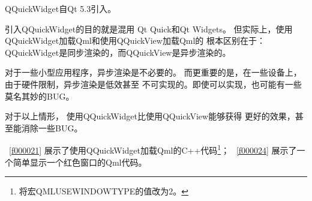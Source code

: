 QQuickWidget自Qt 5.3引入。

引入QQuickWidget的目的就是混用
Qt Quick和Qt Widgets。
但实际上，使用QQuickWidget加载Qml和使用QQuickView加载Qml的
根本区别在于：
QQuickWidget是同步渲染的，而QQuickView是异步渲染的。

对于一些小型应用程序，异步渲染是不必要的。
而更重要的是，在一些设备上，由于硬件限制，异步渲染是低效甚至
不可实现的。即使可以实现，也可能有一些莫名其妙的BUG。

对于以上情形，
使用QQuickWidget比使用QQuickView能够获得
更好的效果，甚至能消除一些BUG。

\lstlistingname\ \ref{f000021}
展示了使用QQuickWidget加载Qml的C{\sourcefonttwo{}+}{\sourcefonttwo{}+}代码\footnote{
将宏QML\underline{\hspace{0.5em}}USE\underline{\hspace{0.5em}}WINDOW\underline{\hspace{0.5em}}TYPE的值改为2。
}；
\lstlistingname\ \ref{f000024}
展示了一个简单显示一个红色窗口的Qml代码。

